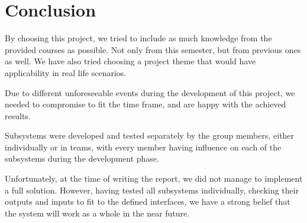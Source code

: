 \chapter{Conclusion}\label{ch:conclusion}

By choosing this project, we tried to include as much knowledge from the provided 
courses as possible. Not only from this semester, but from previous ones as well.
We have also tried choosing a project theme that would have applicability in real 
life scenarios.

Due to different unforeseeable events during the development of this project,
we needed to compromise to fit the time frame,
and are happy with the achieved results.

Subsystems were developed and tested separately by the group members,
either individually or in teams,
with every member having influence on each of the 
subsystems during the development phase.

Unfortunately, at the time of writing the report,
we did not manage to implement a full solution.
However, having tested all subsystems individually,
checking their outputs and inputs to fit to the defined interfaces,
we have a strong belief that the system will work as a whole in the near future.

